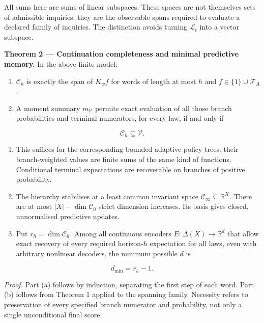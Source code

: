 \documentclass[11pt,a4paper]{article}
\begin{document}
All sums here are sums of linear subspaces. These spaces are not
themselves sets of admissible inquiries; they are the observable spans
required to evaluate a declared family of inquiries. The distinction
avoids turning \(\mathcal L_t\) into a vector subspace.


\textbf{Theorem 2 --- Continuation completeness and minimal predictive
memory.} In the above finite model:

\begin{enumerate}
\def\labelenumi{(\alph{enumi})}
\item
  \(\mathscr C_h\) is exactly the span of \(K_wf\) for words of length
  at most \(h\) and \(f\in\{1\}\cup\mathscr F_A\).
\item
  A moment summary \(m_{\mathscr V}\) permits exact evaluation of all
  those branch probabilities and terminal numerators, for every law, if
  and only if
\end{enumerate}

\[
\boxed{\mathscr C_h\subseteq\mathscr V.}
\]

\begin{enumerate}
\def\labelenumi{(\alph{enumi})}
\setcounter{enumi}{2}
\item
  This suffices for the corresponding bounded adaptive policy trees:
  their branch-weighted values are finite sums of the same kind of
  functions. Conditional terminal expectations are recoverable on
  branches of positive probability.
\item
  The hierarchy stabilises at a least common invariant space
  \(\mathscr C_\infty\subseteq\mathbb R^X\). There are at most
  \(|X|-\dim\mathscr C_0\) strict dimension increases. Its basis gives
  closed, unnormalised predictive updates.
\item
  Put \(r_h=\dim\mathscr C_h\). Among all continuous encoders
  \(E:\Delta(X)\to\mathbb R^d\) that allow exact recovery of every
  required horizon-\(h\) expectation for all laws, even with arbitrary
  nonlinear decoders, the minimum possible \(d\) is
\end{enumerate}

\[
\boxed{d_{\min}=r_h-1.}
\]

\emph{Proof.} Part (a) follows by induction, separating the first step
of each word. Part (b) follows from Theorem 1 applied to the spanning
family. Necessity refers to preservation of every specified branch
numerator and probability, not only a single unconditional final score.
\end{document}
